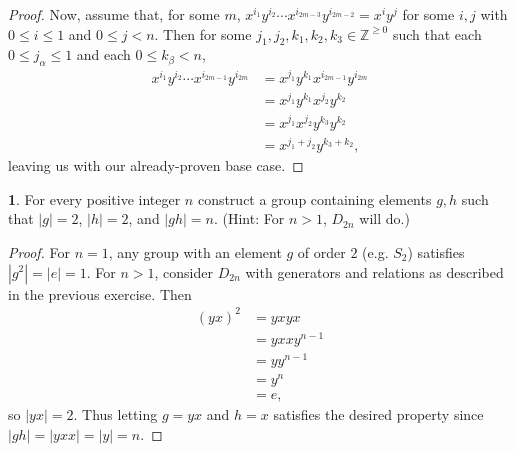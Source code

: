 \documentclass{article}
\theoremstyle{definition}
\newtheorem{ex}{}[section]
\begin{document}
\begin{proof}
	Now, assume that, for some $m$, $x^{i_1}y^{i_2}\cdots x^{i_{2m - 3}}y^{i_{2m - 2}} = x^iy^j$ for some $i, j$ with $0 \leq i \leq 1$ and $0 \leq j < n$.
	Then for some $j_1, j_2, k_1, k_2, k_3 \in \mathbb{Z}^{\geq 0}$ such that each $0 \leq j_\alpha \leq 1$ and each $0 \leq k_\beta < n$, \begin{align*}
		x^{i_1}y^{i_2}\cdots x^{i_{2m - 1}}y^{i_{2m}} & = x^{j_1}y^{k_1}x^{i_{2m - 1}}y^{i_{2m}} \\
		                                              & = x^{j_1}y^{k_1}x^{j_2}y^{k_2}           \\
		                                              & = x^{j_1}x^{j_2}y^{k_3}y^{k_2}           \\
		                                              & = x^{j_1 + j_2}y^{k_3 + k_2},
	\end{align*}
	leaving us with our already-proven base case.
\end{proof}

\begin{ex}
	For every positive integer $n$ construct a group containing elements $g, h$ such that $|g| = 2$, $|h| = 2$, and $|gh| = n$.
	(Hint: For $n > 1$, $D_{2n}$ will do.)
\end{ex}
\begin{proof}
	For $n = 1$, any group with an element $g$ of order $2$ (e.g. $S_2$) satisfies $|g^2| = |e| = 1$.
	For $n > 1$, consider $D_{2n}$ with generators and relations as described in the previous exercise.
	Then \begin{align*}
		(yx)^2 & = yxyx         \\
		       & = yxxy^{n - 1} \\
		       & = yy^{n-1}     \\
		       & = y^n          \\
		       & = e,
	\end{align*}
	so $|yx| = 2$.
	Thus letting $g = yx$ and $h = x$ satisfies the desired property since $|gh| = |yxx| = |y| = n$.
\end{proof}
\end{document}
